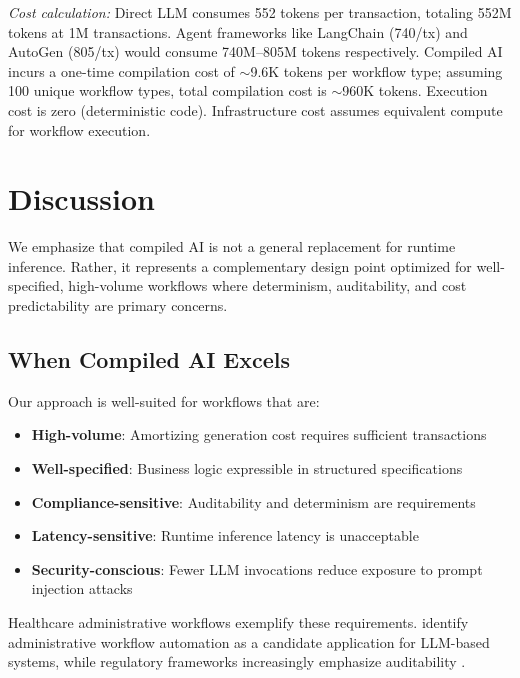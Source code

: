 \documentclass[11pt]{article}
\begin{document}
\noindent\textit{Cost calculation:} Direct LLM consumes 552 tokens per transaction, totaling 552M tokens at 1M transactions. Agent frameworks like LangChain (740/tx) and AutoGen (805/tx) would consume 740M--805M tokens respectively. Compiled AI incurs a one-time compilation cost of $\sim$9.6K tokens per workflow type; assuming 100 unique workflow types, total compilation cost is $\sim$960K tokens. Execution cost is zero (deterministic code). Infrastructure cost assumes equivalent compute for workflow execution.

\section{Discussion}
\label{sec:discussion}

We emphasize that compiled AI is not a general replacement for runtime inference. Rather, it represents a complementary design point optimized for well-specified, high-volume workflows where determinism, auditability, and cost predictability are primary concerns.

\subsection{When Compiled AI Excels}

Our approach is well-suited for workflows that are:
\begin{itemize}
    \item \textbf{High-volume}: Amortizing generation cost requires sufficient transactions
    \item \textbf{Well-specified}: Business logic expressible in structured specifications
    \item \textbf{Compliance-sensitive}: Auditability and determinism are requirements
    \item \textbf{Latency-sensitive}: Runtime inference latency is unacceptable
    \item \textbf{Security-conscious}: Fewer LLM invocations reduce exposure to prompt injection attacks
\end{itemize}

Healthcare administrative workflows exemplify these requirements. \citet{qiu2024healthcare} identify administrative workflow automation as a candidate application for LLM-based systems, while regulatory frameworks increasingly emphasize auditability \citep{fda2025}.
\end{document}
